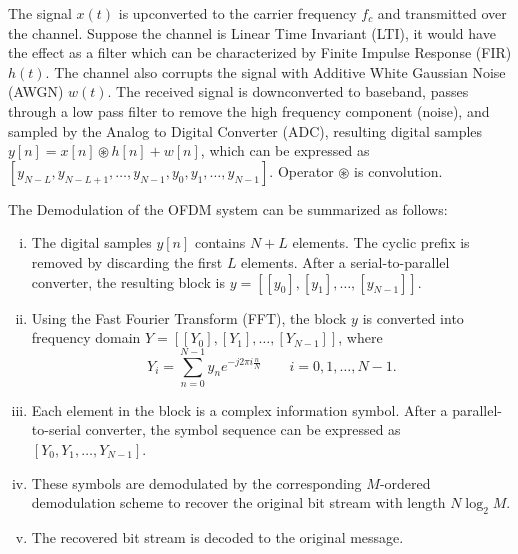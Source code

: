 The signal $x(t)$ is upconverted to the carrier frequency $f_c$ and transmitted over the channel. Suppose the channel is Linear Time Invariant (LTI), it would have the effect as a filter which can be characterized by Finite Impulse Response (FIR) $h(t)$. The channel also corrupts the signal with Additive White Gaussian Noise (AWGN) $w(t)$. The received signal is downconverted to baseband, passes through a low pass filter to remove the high frequency component (noise), and sampled by the Analog to Digital Converter (ADC), resulting digital samples $y[n] = x[n] \circledast h[n] +  w[n]$, which can be expressed as $[y_{N-L}, y_{N-L+1}, \ldots, y_{N-1}, y_0, y_1, \ldots, y_{N-1}]$. Operator $\circledast$ is convolution.

The Demodulation of the OFDM system can be summarized as follows:
\begin{enumerate}[(i)]
    \item The digital samples $y[n]$ contains $N+L$ elements. The cyclic prefix is removed by discarding the first $L$ elements. After a serial-to-parallel converter, the resulting block is $y = [[y_0], [y_1], \ldots, [y_{N-1}]]$.
    \item Using the Fast Fourier Transform (FFT), the block $y$ is converted into frequency domain $Y = [[Y_{0}], [Y_{1}], \ldots, [Y_{N-1}]]$, where
    \begin{equation}
        Y_i = \sum_{n=0}^{N-1}y_n e^{-j2\pi i\frac{n}{N}} \qquad i=0,1,\ldots,N-1.
    \end{equation}
    \item Each element in the block is a complex information symbol. After a parallel-to-serial converter, the symbol sequence can be expressed as $[Y_{0}, Y_{1}, \ldots, Y_{N-1}]$.
    \item These symbols are demodulated by the corresponding $M$-ordered demodulation scheme to recover the original bit stream with length $N\log_2M$.
    \item The recovered bit stream is decoded to the original message.
\end{enumerate}